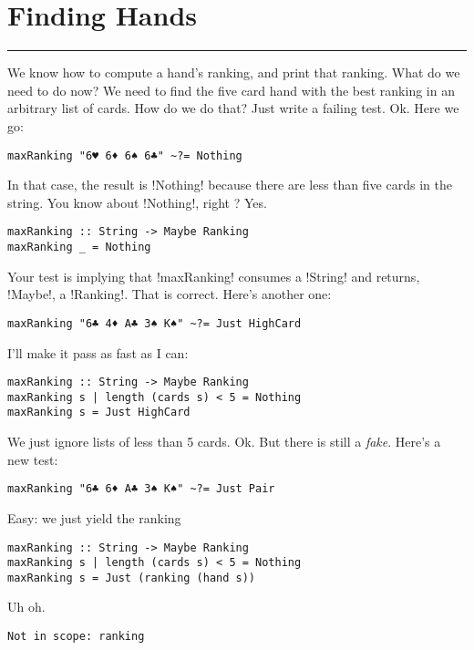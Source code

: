 \newpage
\section{Finding Hands} 
\vspace{10cm}
\hrule

\lhQ We know how to compute a hand's ranking, and print that ranking. What do we need to do now?
\lhA We need to find the five card hand with the best ranking in an arbitrary list of cards.
\lhN How do we do that?
\lhA Just write a failing test.
\lhN Ok. Here we go:
\begin{lstlisting}[frame=single]
maxRanking "6♥ 6♦ 6♠ 6♣" ~?= Nothing
\end{lstlisting}
In that case, the result is \il!Nothing! because there are less than five cards in the string. You know about \il!Nothing!, right ?
\lhA \error Yes. 
\begin{lstlisting}[frame=single]
maxRanking :: String -> Maybe Ranking
maxRanking _ = Nothing
\end{lstlisting}
\success Your test is implying that \il!maxRanking! consumes a \il!String! and returns, \il!Maybe!, a \il!Ranking!. 
\lhN That is correct. Here's another one:
\begin{lstlisting}[frame=single]
maxRanking "6♣ 4♦ A♣ 3♠ K♠" ~?= Just HighCard
\end{lstlisting}
\lhA \failure I'll make it pass as fast as I can:
\begin{lstlisting}[frame=single]
maxRanking :: String -> Maybe Ranking
maxRanking s | length (cards s) < 5 = Nothing
maxRanking s = Just HighCard
\end{lstlisting}
\success We just ignore lists of less than 5 cards.
\lhN Ok. But there is still a \emph{fake}. Here's a new test:
\begin{lstlisting}[frame=single]
maxRanking "6♣ 6♦ A♣ 3♠ K♠" ~?= Just Pair
\end{lstlisting}
\lhA Easy: we just yield the ranking
\begin{lstlisting}[frame=single]
maxRanking :: String -> Maybe Ranking
maxRanking s | length (cards s) < 5 = Nothing
maxRanking s = Just (ranking (hand s))
\end{lstlisting}
\error Uh oh.
\lhN
\begin{small}
\begin{verbatim}
Not in scope: ranking
\end{verbatim}
\end{small}
